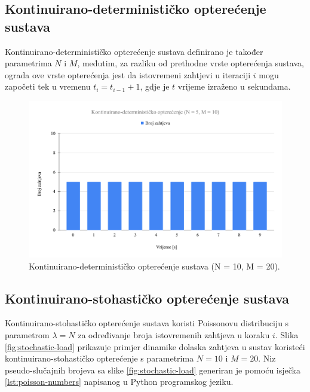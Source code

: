 \documentclass[times, utf8, diplomski]{fer}
\begin{document}
\subsection{Kontinuirano-determinističko opterećenje sustava}
Kontinuirano-determinističko opterećenje sustava definirano je također parametrima $N$ i $M$, međutim, za razliku od prethodne vrste opterećenja sustava, ograda ove vrste opterećenja jest da istovremeni zahtjevi u iteraciji $i$ mogu započeti tek u vremenu $t_i = t_{i - 1} + 1$, gdje je $t$ vrijeme izraženo u sekundama.

\begin{figure}[htb]
	\centering
	\includegraphics[width=\textwidth]{images/Kontinuirano-determinističko opterećenje (N = 5, M = 10).pdf}
	\caption{
		Kontinuirano-determinističko opterećenje sustava (N = 10, M = 20).
	}
	\label{fig:deterministic-load}
\end{figure}

\subsection{Kontinuirano-stohastičko opterećenje sustava}
Kontinuirano-stohastičko opterećenje sustava koristi Poissonovu distribuciju s parametrom $\lambda = N$ za određivanje broja istovremenih zahtjeva u koraku $i$. Slika \ref{fig:stochastic-load} prikazuje primjer dinamike dolaska zahtjeva u sustav koristeći kontinuirano-stohastičko opterećenje s parametrima $N=10$ i $M=20$. Niz pseudo-slučajnih brojeva sa slike \ref{fig:stochastic-load} generiran je pomoću isječka \ref{lst:poisson-numbers} napisanog u Python programskog jeziku.
\end{document}

